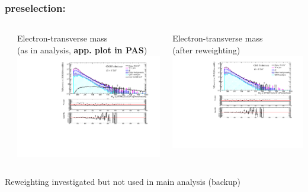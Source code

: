 \documentclass[bigger]{beamer}
\providecommand{\alert}[1]{\textbf{#1}}
\begin{document}
\begin{frame}
\frametitle{\enujj preselection: \mt}
\label{sec-3-1-4}
\begin{columns} %
\label{sec-3-1-4-1}
\begin{column}{0.6\textwidth}
\label{sec-3-1-4-1-1}

\centering
Electron-\met transverse mass \\ (as in analysis, \alert{app. plot in PAS})
\includegraphics[width=\textwidth]{fig/enu/preselection/MTenu_PAS_enujj.pdf}
\end{column}
\begin{column}{0.6\textwidth}
\label{sec-3-1-4-1-2}

\centering
Electron-\met transverse mass \\ (after reweighting)
\includegraphics[width=\textwidth]{fig/enu/reweight/MTenu_PAS_enujjMETandMTReweighted.pdf}
\end{column}
\end{columns}
\label{sec-3-1-4-2}

\small
\centering
Reweighting investigated but not used in main analysis (backup)
\normalsize
\end{frame}
\end{document}
